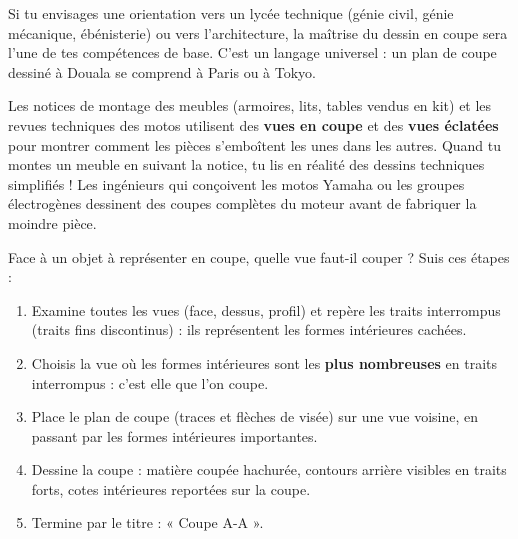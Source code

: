 \documentclass[11pt]{article}
\newcommand{\cle}[1]{{\popxbold\color{popdark}#1}}
\newcounter{popsec}
\newcounter{popsub}
\newcommand{\courssub}[1]{%
  \stepcounter{popsub}%
  \par\vspace{9pt}\noindent{\popxbold\fontsize{11.5}{13}\selectfont\color{popink}{\color{poporange}\thepopsec.\thepopsub}\hspace{6pt}#1}\par\nopagebreak\vspace{4pt}
}
\begin{document}
Si tu envisages une orientation vers un lycée technique (génie civil, génie mécanique, ébénisterie) ou vers l'architecture, la maîtrise du dessin en coupe sera l'une de tes compétences de base. C'est un langage universel : un plan de coupe dessiné à Douala se comprend à Paris ou à Tokyo.

\begin{savaistu}
Les notices de montage des meubles (armoires, lits, tables vendus en kit) et les revues techniques des motos utilisent des \textbf{vues en coupe} et des \textbf{vues éclatées} pour montrer comment les pièces s'emboîtent les unes dans les autres. Quand tu montes un meuble en suivant la notice, tu lis en réalité des dessins techniques simplifiés ! Les ingénieurs qui conçoivent les motos Yamaha ou les groupes électrogènes dessinent des coupes complètes du moteur avant de fabriquer la moindre pièce.
\end{savaistu}

\begin{methode}
Face à un objet à représenter en coupe, quelle vue faut-il couper ? Suis ces étapes :
\begin{enumerate}
\item Examine toutes les vues (face, dessus, profil) et repère les \cle{traits interrompus} (traits fins discontinus) : ils représentent les formes intérieures cachées.
\item Choisis la vue où les formes intérieures sont les \textbf{plus nombreuses} en traits interrompus : c'est elle que l'on coupe.
\item Place le plan de coupe (traces et flèches de visée) sur une vue voisine, en passant par les formes intérieures importantes.
\item Dessine la coupe : matière coupée hachurée, contours arrière visibles en traits forts, cotes intérieures reportées sur la coupe.
\item Termine par le titre : « Coupe A-A ».
\end{enumerate}
\end{methode}

\courssub{Synthèse de la leçon}
\end{document}
